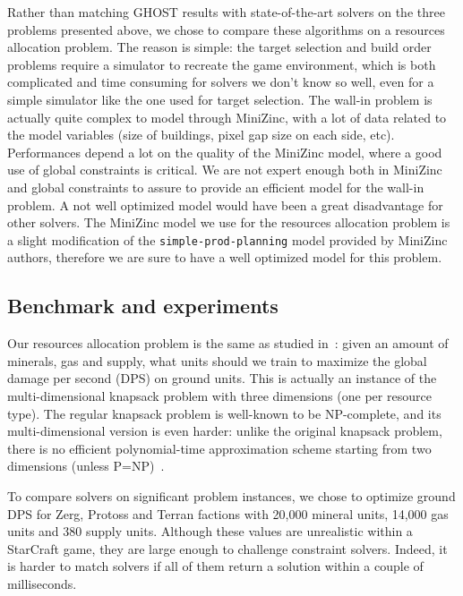 \documentclass[journal]{IEEEtran}
\newcommand{\ghost}{\textsc{GHOST}\xspace}
\begin{document}
Rather than  matching \ghost results with  state-of-the-art solvers on
the  three  problems  presented  above, we  chose  to  compare  these
algorithms on  a resources allocation  problem. The reason  is simple:
the target selection  and build order problems require  a simulator to
recreate  the game  environment, which  is both  complicated and  time
consuming  for solvers  we  don't  know so  well,  even  for a  simple
simulator like the one used  for target selection. The wall-in problem
is actually quite complex to model through MiniZinc, with a lot of data
related to the  model variables (size of buildings, pixel  gap size on
each side,  etc).  Performances  depend a  lot on  the quality  of the
MiniZinc model, where a good use of global constraints is critical. We
are  not expert  enough both  in  MiniZinc and  global constraints  to
assure to provide  an efficient model for the wall-in  problem.  A not
well optimized  model would have  been a great disadvantage  for other
solvers.   The MiniZinc  model  we use  for  the resources  allocation
problem  is a  slight  modification  of the {\tt simple-prod-planning} model  provided by  MiniZinc
authors, therefore we are sure to have a well optimized model for this problem.

\subsection{Benchmark and experiments}

Our   resources   allocation   problem   is  the   same   as   studied
in~\cite{aiide15_rts}: given  an amount  of minerals, gas  and supply,
what units  should we train to  maximize the global damage  per second
(DPS) on  ground units.
This is actually an instance of the multi-dimensional knapsack problem
with three  dimensions (one per  resource type). The  regular knapsack
problem  is well-known  to be  NP-complete, and  its multi-dimensional
version is even harder: unlike the original knapsack problem, there is
no efficient  polynomial-time approximation  scheme starting  from two
dimensions (unless P=NP)~\cite{KulikS10}.

To  compare solvers  on  significant problem  instances,  we chose  to
optimize ground DPS for Zerg,  Protoss and Terran factions with 20,000
mineral units, 14,000  gas units and 380 supply  units. Although these
values are unrealistic within a  StarCraft game, they are large enough
to challenge constraint solvers. Indeed, it is harder to match solvers
if all of them return a solution within a couple of milliseconds.
\end{document}
